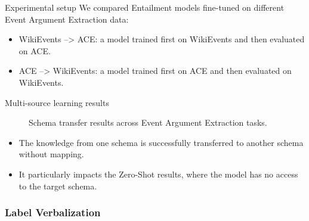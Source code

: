 \documentclass[
    11pt,
    notheorems,
    xcolor={dvipsnames},
    hyperref={
        pdfstartview=FitH, 
        pdftitle={Ikasketa-adibide urriko Informazio-Erauzketa}, 
        pdfauthor={Oscar Sainz Jimenez}, 
        citecolor=secondary, 
    }
]{beamer}
\begin{document}
\begin{frame}
    \begin{block}{Experimental setup}
        We compared Entailment models fine-tuned on different Event Argument Extraction data:
        \begin{itemize}
            \item WikiEvents --> ACE: a model trained first on WikiEvents and then evaluated on ACE.
            \item ACE --> WikiEvents: a model trained first on ACE and then evaluated on WikiEvents.
        \end{itemize}

    \end{block}
\end{frame}

\begin{frame}
    \begin{block}{Multi-source learning results}
        \begin{figure}
            \centering
            \resizebox{.60\textwidth}{!}{
                
            }
            \caption{Schema transfer results across Event Argument Extraction tasks.}
        \end{figure}

        \begin{itemize}
            \item The knowledge from one schema is successfully transferred to another schema without mapping.
            \item It particularly impacts the Zero-Shot results, where the model has no access to the target schema.
        \end{itemize}
    \end{block}

\end{frame}


\subsubsection{Label Verbalization}

\end{document}
